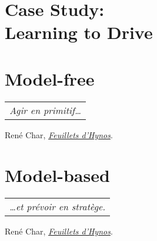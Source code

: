 \setcounter{mtc}{-1}
\adjustmtc




\part[Case Study: Learning to Drive]{Case Study:\\Learning to Drive}
\label{part:1}




\part{Model-free}
\label{part:2}

\vspace*{2cm}
\begin{flushright}
	\begin{tabular}{@{}l@{}}
		\emph{Agir en primitif\dots}\\
	\end{tabular}
	
	René Char, \href{https://eleurent.github.io/sisyphe/texts/feuillets-d-hypnos.html}{\emph{Feuillets d'Hynos}}.
\end{flushright}




\part{Model-based}
\label{part:3}

\vspace*{2cm}
\begin{flushright}
	\begin{tabular}{@{}l@{}}
		\emph{\dots et prévoir en stratège.}\\
	\end{tabular}
	
	René Char, \href{https://eleurent.github.io/sisyphe/texts/feuillets-d-hypnos.html}{\emph{Feuillets d'Hynos}}.
\end{flushright}




